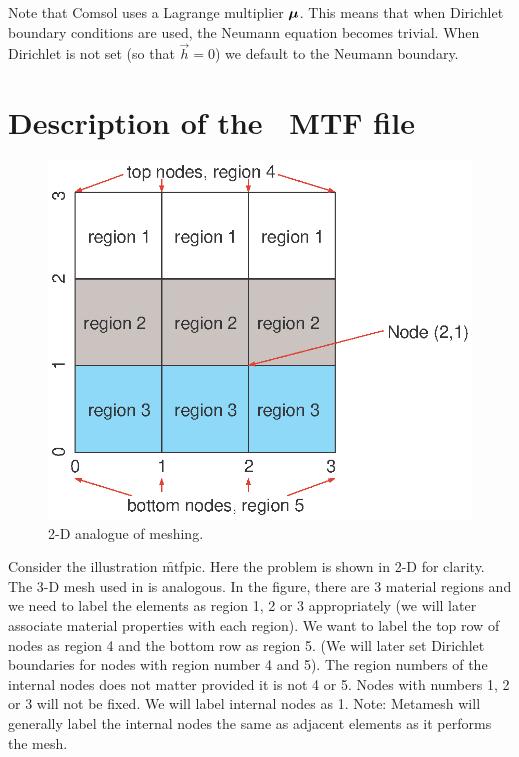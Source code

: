 \documentclass[a4paper,twoside,11pt]{book}
\begin{document}
Note that Comsol uses a Lagrange multiplier $\mbox{\boldmath $\mu$}$. This means
that when Dirichlet boundary conditions are used, the Neumann equation
 becomes trivial. When Dirichlet is not set (so that $\vec
h=0$) we default to the Neumann boundary.

\chapter{Description of the \zinc\ MTF file}
\label{mtfdesc}

\begin{figure}
  \includegraphics{mtfpic}
  \caption{2-D analogue of \zinc meshing.}
  \label{mtfpic}
\end{figure}
Consider the illustration \f{mtfpic}. Here the problem is shown in 2-D
for clarity. The 3-D mesh used in \zinc is analogous. In the figure, there are 3
material regions and we need to label the elements as region 1, 2 or 3
appropriately (we will later associate material properties with each
region). We want to label the top row of nodes as region 4 and the
bottom row as region 5. (We will later set Dirichlet boundaries for
nodes with region number 4 and 5). The region numbers of the internal
nodes does not matter provided it is not 4 or 5. Nodes with numbers 1,
2 or 3 will not be fixed. We will label internal nodes as 1. Note:
Metamesh will generally label the internal nodes the same as adjacent
elements as it performs the mesh.
\end{document}
